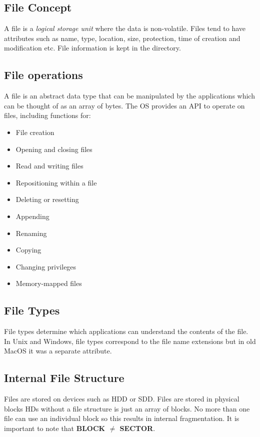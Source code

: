 \documentclass{article}%
\begin{document}
\subsection{File Concept}
\label{sec:org3a870a9}
A file is a \emph{logical storage unit} where the data is non-volatile.
Files tend to have attributes such as name, type, location, size, protection, time of creation and modification etc.
File information is kept in the directory.

\subsection{File operations}
\label{sec:org6aaaa07}
A file is an abstract data type that can be manipulated by the applications which can be thought of as an array of bytes.
The OS provides an API to operate on files, including functions for:
\begin{itemize}
\item File creation
\item Opening and closing files
\item Read and writing files
\item Repositioning within a file
\item Deleting or resetting
\item Appending
\item Renaming
\item Copying
\item Changing privileges
\item Memory-mapped files
\end{itemize}

\subsection{File Types}
\label{sec:org7884c66}
File types determine which applications can understand the contents of the file.
In Unix and Windows, file types correspond to the file name extensions but in old MacOS it was a separate attribute.

\subsection{Internal File Structure}
\label{sec:orgee84179}
Files are stored on devices such as HDD or SDD.
Files are stored in physical blocks HDs without a file structure is just an array of blocks.
No more than one file can use an individual block so this results in internal fragmentation.
It is important to note that \textbf{BLOCK \(\ne\) SECTOR}.
\end{document}
